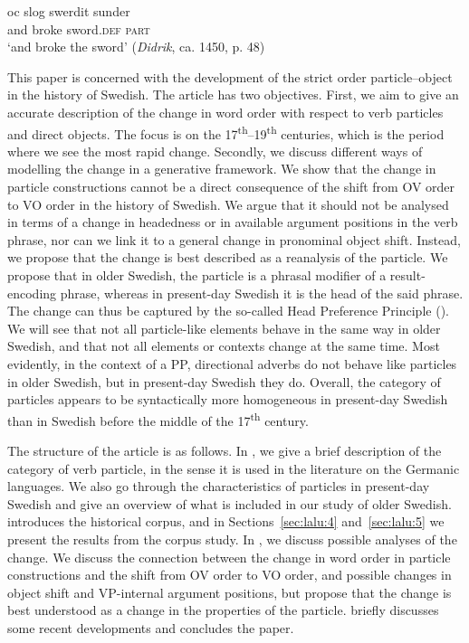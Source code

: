 \documentclass[output=paper]{langscibook}
\begin{document}
\ex
\gll oc    slog     swerdit     sunder\\
      and  broke   sword\textsc{.def}   \textsc{part}\\
  \glt  ‘and broke the sword’ (\textit{Didrik}, ca. 1450, p. 48)

\z
\z

This paper is concerned with the development of the strict order particle–object in the history of Swedish. The article has two objectives. First, we aim to give an accurate description of the change in word order with respect to verb particles and direct objects. The focus is on the 17\textsuperscript{th}--19\textsuperscript{th} centuries, which is the period where we see the most rapid change. Secondly, we discuss different ways of modelling the change in a generative framework. We show that the change in particle constructions cannot be a direct consequence of the shift from OV order to VO order in the history of Swedish. We argue that it should not be analysed in terms of a change in headedness or in available argument positions in the verb phrase, nor can we link it to a general change in pronominal object shift. Instead, we propose that the change is best described as a reanalysis of the particle. We propose that in older Swedish, the particle is a phrasal modifier of a result-encoding phrase, whereas in present-day Swedish it is the head of the said phrase. The change can thus be captured by the so-called Head Preference Principle (\citealt{van_Gelderen2004}). We will see that not all particle-like elements behave in the same way in older Swedish, and that not all elements or contexts change at the same time. Most evidently, in the context of a PP, directional adverbs do not behave like particles in older Swedish, but in present-day Swedish they do. Overall, the category of particles appears to be syntactically more homogeneous in present-day Swedish than in Swedish before the middle of the 17\textsuperscript{th} century. 



The structure of the article is as follows. In , we give a brief description of the category of verb particle, in the sense it is used in the literature on the Germanic languages. We also go through the characteristics of particles in present-day Swedish and give an overview of what is included in our study of older Swedish.  introduces the historical corpus, and in Sections~\ref{sec:lalu:4} and~\ref{sec:lalu:5} we present the results from the corpus study. In , we discuss possible analyses of the change. We discuss the connection between the change in word order in particle constructions and the shift from OV order to VO order, and possible changes in object shift and VP-internal argument positions, but propose that the change is best understood as a change in the properties of the particle.  briefly discusses some recent developments and concludes the paper.
\end{document}
